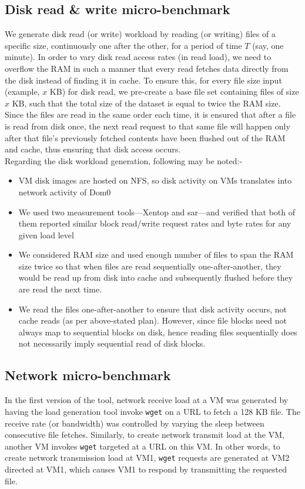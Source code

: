 \subsection{Disk read \& write micro-benchmark}
We generate disk read (or write) workload by reading 
(or writing) files of a specific size, continuously one after the other, 
for a period of time $T$ (say, one minute). 
In order to vary disk read access rates (in read load), we need to
overflow the RAM in such a manner that every read fetches 
data directly from the disk instead of finding it in cache. To
ensure this, for every file size input (example, $x$ KB) for disk read, 
we pre-create a base file set
containing files of size $x$ KB, such that 
the total size of the dataset is equal to twice the RAM size.
Since the files are read in the same order each time, 
it is ensured that after a file is read from
disk once, the next read request to that same 
file will happen only after that file’s previously
fetched contents have been flushed out of the RAM and cache, 
thus ensuring that disk access occurs.
\\
Regarding the disk workload generation, following may be noted:-
\begin{itemize}
\item VM disk images are hosted on NFS, so disk activity on VMs translates 
into network activity of Dom0
\item We used two measurement tools---Xentop and sar---and verified that 
both of them reported similar block read/write request rates and byte rates 
for any given load level
\item We considered RAM size and used enough number of files to span the 
RAM size twice so that when files are read sequentially 
one-after-another, they would be read up from disk into cache and 
subsequently flushed before they are read the next time.
\item We read the files one-after-another to ensure that disk activity 
occurs, not cache reads (as per above-stated plan). However, since file 
blocks need not always map to sequential blocks on disk, hence reading 
files sequentially does not necessarily imply sequential read of disk blocks.
\end{itemize}

\subsection{Network micro-benchmark}
In the first version of the tool, 
network receive load at a VM was generated by having the load generation
tool invoke \texttt{wget} on a URL to fetch a 128 KB file. 
The receive rate (or bandwidth) was controlled
by varying the sleep between consecutive file fetches. 
Similarly, to create network transmit load
at the VM, another VM invokes \texttt{wget} targeted at a 
URL on this VM. In other words, to create network
transmission load at VM1, \texttt{wget} requests are
generated at VM2 directed at VM1, which causes
VM1 to respond by transmitting the requested file. 
	
